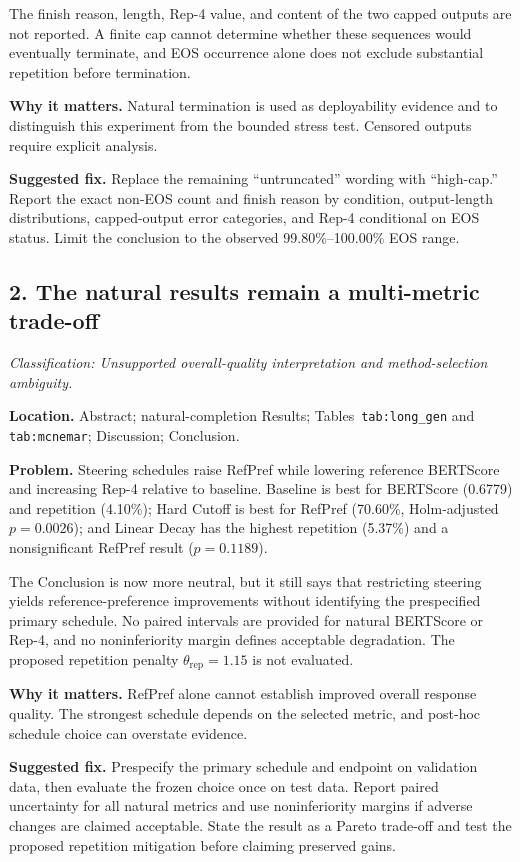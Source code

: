 \documentclass[11pt]{article}
\newcommand{\findinglabel}[1]{\textbf{#1}}
\newcommand{\classification}[1]{\textit{Classification: #1.}}
\begin{document}
The finish reason, length, Rep-4 value, and content of the two capped outputs are not reported.  A finite cap cannot determine whether these sequences would eventually terminate, and EOS occurrence alone does not exclude substantial repetition before termination.

\findinglabel{Why it matters.} Natural termination is used as deployability evidence and to distinguish this experiment from the bounded stress test.  Censored outputs require explicit analysis.

\findinglabel{Suggested fix.} Replace the remaining ``untruncated'' wording with ``high-cap.''  Report the exact non-EOS count and finish reason by condition, output-length distributions, capped-output error categories, and Rep-4 conditional on EOS status.  Limit the conclusion to the observed 99.80\%--100.00\% EOS range.

\subsection*{2. The natural results remain a multi-metric trade-off}

\classification{Unsupported overall-quality interpretation and method-selection ambiguity}

\findinglabel{Location.} Abstract; natural-completion Results; Tables~\texttt{tab:long\_gen} and \texttt{tab:mcnemar}; Discussion; Conclusion.

\findinglabel{Problem.} Steering schedules raise RefPref while lowering reference BERTScore and increasing Rep-4 relative to baseline.  Baseline is best for BERTScore (0.6779) and repetition (4.10\%); Hard Cutoff is best for RefPref (70.60\%, Holm-adjusted $p=0.0026$); and Linear Decay has the highest repetition (5.37\%) and a nonsignificant RefPref result ($p=0.1189$).

The Conclusion is now more neutral, but it still says that restricting steering yields reference-preference improvements without identifying the prespecified primary schedule.  No paired intervals are provided for natural BERTScore or Rep-4, and no noninferiority margin defines acceptable degradation.  The proposed repetition penalty $\theta_{\text{rep}}=1.15$ is not evaluated.

\findinglabel{Why it matters.} RefPref alone cannot establish improved overall response quality.  The strongest schedule depends on the selected metric, and post-hoc schedule choice can overstate evidence.

\findinglabel{Suggested fix.} Prespecify the primary schedule and endpoint on validation data, then evaluate the frozen choice once on test data.  Report paired uncertainty for all natural metrics and use noninferiority margins if adverse changes are claimed acceptable.  State the result as a Pareto trade-off and test the proposed repetition mitigation before claiming preserved gains.
\end{document}
